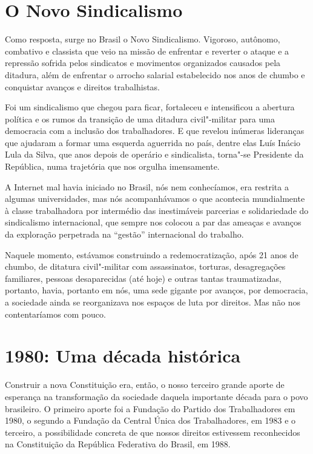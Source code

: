 \section{O Novo Sindicalismo}

Como resposta, surge no Brasil o Novo Sindicalismo. Vigoroso, autônomo,
combativo e classista que veio na missão de enfrentar e reverter o
ataque e a repressão sofrida pelos sindicatos e movimentos organizados
causados pela ditadura, além de enfrentar o arrocho salarial
estabelecido nos anos de chumbo e conquistar avanços e direitos
trabalhistas.

Foi um sindicalismo que chegou para ficar, fortaleceu e intensificou a
abertura política e os rumos da transição de uma ditadura civil"-militar
para uma democracia com a inclusão dos trabalhadores. E que revelou
inúmeras lideranças que ajudaram a formar uma esquerda aguerrida no
país, dentre elas Luís Inácio Lula da Silva, que anos depois de operário
e sindicalista, torna"-se Presidente da República, numa trajetória que
nos orgulha imensamente.

A Internet mal havia iniciado no Brasil, nós nem conhecíamos, era
restrita a algumas universidades, mas nós acompanhávamos o que acontecia
mundialmente à classe trabalhadora por intermédio das inestimáveis
parcerias e solidariedade do sindicalismo internacional, que sempre nos
colocou a par das ameaças e avanços da exploração perpetrada na
``gestão'' internacional do trabalho.

Naquele momento, estávamos construindo a redemocratização, após 21 anos
de chumbo, de ditatura civil"-militar com assassinatos, torturas,
desagregações familiares, pessoas desaparecidas (até hoje) e outras
tantas traumatizadas, portanto, havia, portanto em nós, uma sede gigante
por avanços, por democracia, a sociedade ainda se reorganizava nos
espaços de luta por direitos. Mas não nos contentaríamos com pouco.

\section{1980: Uma década histórica}

Construir a nova Constituição era, então, o nosso terceiro grande aporte
de esperança na transformação da sociedade daquela importante década
para o povo brasileiro. O primeiro aporte foi a Fundação do Partido dos
Trabalhadores em 1980, o segundo a Fundação da Central Única dos
Trabalhadores, em 1983 e o terceiro, a possibilidade concreta de que
nossos direitos estivessem reconhecidos na Constituição da República
Federativa do Brasil, em 1988.

